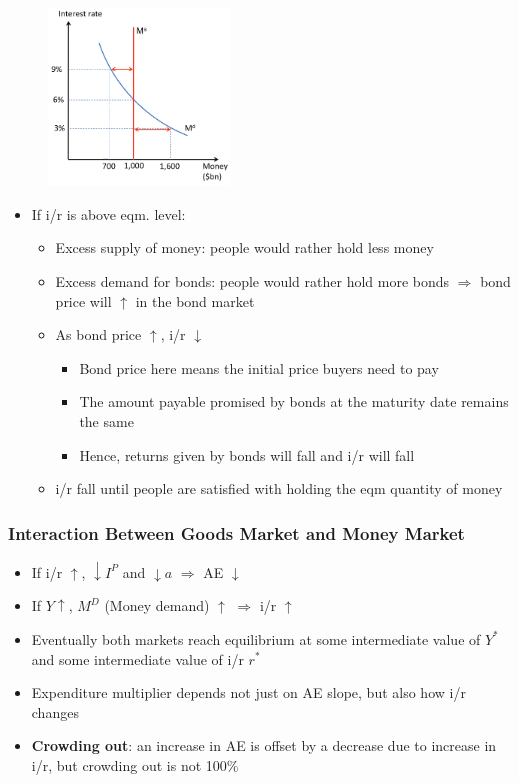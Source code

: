 \documentclass{article}
\begin{document}
\begin{multicols}{2}
\begin{figure}[H]
	\centering
	\includegraphics[width=13em]{images/money_market.png}
\end{figure}
\begin{itemize}
	\item If i/r is above eqm. level:
	\begin{itemize}
		\item Excess supply of money: people would rather hold less money
		\item Excess demand for bonds: people would rather hold more bonds $\Rightarrow$ bond price will $\uparrow$ in the bond market
		\item As bond price $\uparrow$, i/r $\downarrow$
		\begin{itemize}
			\item Bond price here means the initial price buyers need to pay
			\item The amount payable promised by bonds at the maturity date remains the same
			\item Hence, returns given by bonds will fall and i/r will fall
		\end{itemize}
	    \item i/r fall until people are satisfied with holding the eqm quantity of money
	\end{itemize}
\end{itemize}

\subsubsection{Interaction Between Goods Market and Money Market}
\begin{itemize}
	\item If i/r $\uparrow$, $\downarrow I^P$ and $\downarrow a$ $\Rightarrow$ AE $\downarrow$
	\item If $Y \uparrow$, $M^D$ (Money demand) $\uparrow$ $\Rightarrow$ i/r $\uparrow$
	\item Eventually both markets reach equilibrium at some intermediate value of $Y^*$ and some intermediate value of i/r $r^*$
	\item Expenditure multiplier depends not just on AE slope, but also how i/r changes
	\item \textbf{Crowding out}: an increase in AE is offset by a decrease due to increase in i/r, but crowding out is not 100\%
\end{itemize}

\end{multicols}
\end{document}
